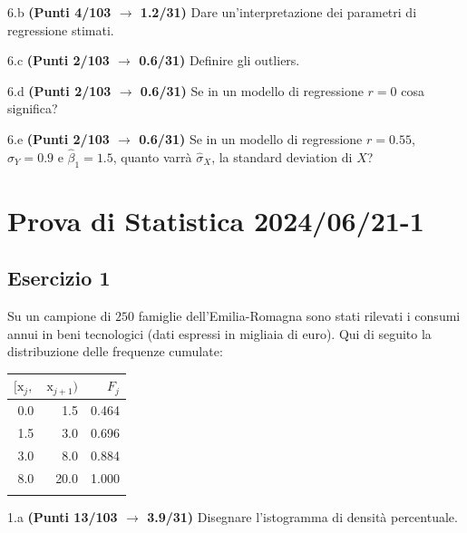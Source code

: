 \documentclass[
  11pt,
]{book}
\theoremstyle{mytheoremstyle}
\theoremstyle{mydefstyle}
\begin{document}
6.b \textbf{(Punti 4/103 \(\rightarrow\) 1.2/31)} Dare un'interpretazione dei parametri di regressione stimati.

6.c \textbf{(Punti 2/103 \(\rightarrow\) 0.6/31)} Definire gli outliers.

6.d \textbf{(Punti 2/103 \(\rightarrow\) 0.6/31)} Se in un modello di regressione \(r=0\) cosa significa?

6.e \textbf{(Punti 2/103 \(\rightarrow\) 0.6/31)} Se in un modello di regressione \(r=0.55\), \(\hat\sigma_Y=0.9\) e \(\hat\beta_1=1.5\), quanto varrà
\(\hat\sigma_X\), la standard deviation di \(X\)?

\section{Prova di Statistica 2024/06/21-1}\label{prova-di-statistica-20240621-1}

\subsection{Esercizio 1}\label{esercizio-1-37}

Su un campione di \(250\) famiglie dell'Emilia-Romagna sono stati rilevati i consumi annui in beni tecnologici (dati espressi in migliaia di euro). Qui di seguito la distribuzione delle frequenze cumulate:

\begin{table}[H]
\centering
\begin{tabular}{rrr}
\toprule
$[\text{x}_j,$ & $\text{x}_{j+1})$ & $F_j$\\
\midrule
0.0 & 1.5 & 0.464\\
1.5 & 3.0 & 0.696\\
3.0 & 8.0 & 0.884\\
8.0 & 20.0 & 1.000\\
 &  & \\
\bottomrule
\end{tabular}
\end{table}

1.a \textbf{(Punti 13/103 \(\rightarrow\) 3.9/31)} Disegnare l'istogramma di densità percentuale.
\end{document}
